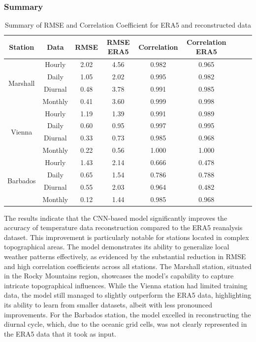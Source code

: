 \subsubsection*{Summary}

\begin{table}
\centering
\begin{tabular}{|c|c|c|c|c|c|c|c|c|}
\hline
Station & Data & RMSE & RMSE ERA5 & Correlation & Correlation ERA5 \\
\hline
\multirow{4}{*}{Marshall} & Hourly & 2.02 & 4.56 & 0.982 & 0.965 \\
& Daily & 1.05 & 2.02 & 0.995 & 0.982 \\
& Diurnal & 0.48 & 3.78 & 0.991 & 0.985 \\
& Monthly & 0.41 & 3.60 & 0.999 & 0.998 \\
\hline
\multirow{4}{*}{Vienna} & Hourly & 1.19 & 1.39 & 0.991 & 0.989 \\
& Daily & 0.60 & 0.95 & 0.997 & 0.995 \\
& Diurnal & 0.33 & 0.73 & 0.985 & 0.968 \\
& Monthly & 0.22 & 0.56 & 1.000 & 1.000 \\
\hline
\multirow{4}{*}{Barbados} & Hourly & 1.43 & 2.14 & 0.666 & 0.478 \\
& Daily & 0.65 & 1.54 & 0.786 & 0.788 \\
& Diurnal & 0.55 & 2.03 & 0.964 & 0.482 \\
& Monthly & 0.12 & 1.44 & 0.985 & 0.968 \\
\hline
\end{tabular}
\caption{Summary of RMSE and Correlation Coefficient for ERA5 and reconstructed data}
\label{tab:results_summary}
\end{table}

The results indicate that the CNN-based model significantly improves the accuracy of temperature data reconstruction compared to the ERA5 reanalysis dataset. This improvement is particularly notable for stations located in complex topographical areas.
The model demonstrates its ability to generalize local weather patterns effectively, as evidenced by the substantial reduction in RMSE and high correlation coefficients across all stations. The Marshall station, situated in the Rocky Mountains region, showcases the model's capability to capture intricate topographical influences.
While the Vienna station had limited training data, the model still managed to slightly outperform the ERA5 data, highlighting its ability to learn from smaller datasets, albeit with less pronounced improvements.
For the Barbados station, the model excelled in reconstructing the diurnal cycle, which, due to the oceanic grid cells, was not clearly represented in the ERA5 data that it took as input.